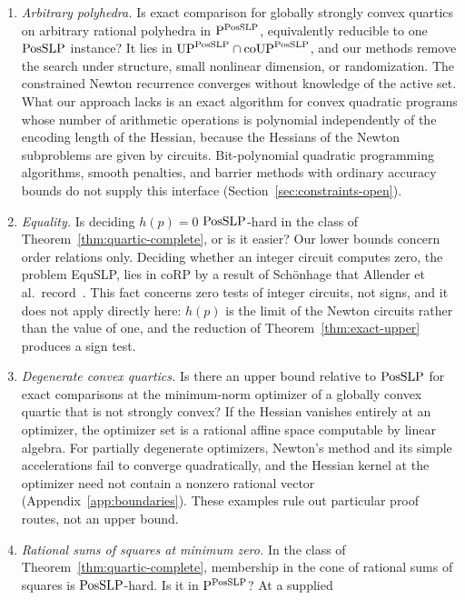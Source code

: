 \begin{enumerate}[label=\arabic*.,leftmargin=*]
\item \emph{Arbitrary polyhedra.} Is exact comparison for globally strongly
  convex quartics on arbitrary rational polyhedra in $\mathrm P^{\mathrm{PosSLP}}$,
  equivalently reducible to one $\mathrm{PosSLP}$ instance? It lies in
  $\mathrm{UP}^{\mathrm{PosSLP}}\cap\mathrm{coUP}^{\mathrm{PosSLP}}$, and our methods remove
  the search under structure, small nonlinear dimension, or randomization.
  The constrained Newton recurrence converges without knowledge of the active
  set. What our approach lacks is an exact algorithm for convex quadratic
  programs whose number of arithmetic operations is polynomial independently
  of the encoding length of the Hessian, because the Hessians of the Newton
  subproblems are given by circuits. Bit-polynomial quadratic programming
  algorithms, smooth penalties, and barrier methods with ordinary accuracy
  bounds do not supply this interface (Section~\ref{sec:constraints-open}).
\item \emph{Equality.} Is deciding $h(p)=0$ $\mathrm{PosSLP}$-hard in the class of
  Theorem~\ref{thm:quartic-complete}, or is it easier? Our lower bounds
  concern order relations only. Deciding whether an integer circuit computes
  zero, the problem EquSLP, lies in coRP by a result of Sch\"onhage that
  Allender et al.\ record~\cite[Section~2]{AllenderEtAl2009}. This fact
  concerns zero tests of integer circuits, not signs, and it does not apply
  directly here: $h(p)$ is the limit of the Newton circuits rather than the
  value of one, and the reduction of Theorem~\ref{thm:exact-upper} produces a
  sign test.
\item \emph{Degenerate convex quartics.} Is there an upper bound relative to
  $\mathrm{PosSLP}$ for exact comparisons at the minimum-norm optimizer of a globally
  convex quartic that is not strongly convex? If the Hessian vanishes entirely
  at an optimizer, the optimizer set is a rational affine space computable by
  linear algebra. For partially degenerate optimizers, Newton's method and its
  simple accelerations fail to converge quadratically, and the Hessian kernel
  at the optimizer need not contain a nonzero rational vector
  (Appendix~\ref{app:boundaries}). These examples rule out particular proof
  routes, not an upper bound.
\item \emph{Rational sums of squares at minimum zero.} In the class of
  Theorem~\ref{thm:quartic-complete}, membership in the cone of rational sums
  of squares is $\mathrm{PosSLP}$-hard. Is it in $\mathrm P^{\mathrm{PosSLP}}$? At a supplied

\end{enumerate}
